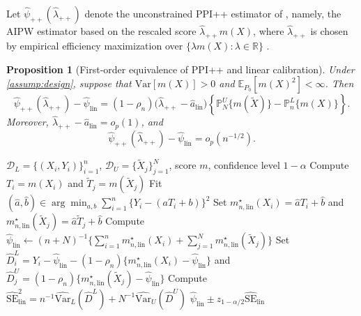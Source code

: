 \documentclass{article}
\theoremstyle{plain}
\newtheorem{proposition}{Proposition}
\theoremstyle{definition}
\newcommand{\E}{\mathbb{E}}
\newcommand{\Var}{\mathrm{Var}}
\newcommand{\1}{\mathbbm{1}}
\newcommand{\mhat}{m}
\newcommand{\rhon}{\rho_n}
\newcommand{\Pl}{\mathbb{P}^{L}_n}
\newcommand{\Pu}{\mathbb{P}^{U}_N}
\begin{document}
Let $\widehat{\psi}_{++}(\widehat{\lambda}_{++})$ denote the
unconstrained PPI++ estimator of \citet{angelopoulos2023ppi},
namely, the AIPW estimator based on the rescaled score
$\widehat{\lambda}_{++}m(X)$, where
$\widehat{\lambda}_{++}$ is chosen by empirical efficiency
maximization over $\{\lambda m(X):\lambda\in\mathbb R\}$
\citep{rubin2008empirical}.

\begin{proposition}[First-order equivalence of PPI++ and linear calibration]
\label{prop:ppi++-linear}
Under \cref{assump:design}, suppose that
$\Var[m(X)]>0$ and $\E_{P_0}[m(X)^2]<\infty$.
Then
\[
\widehat\psi_{++}(\hat\lambda_{++})-\widehat\psi_{\mathrm{lin}}
=
(1-\rho_n)\bigl(\hat\lambda_{++}-\hat a_{\mathrm{lin}}\bigr)
\left\{\Pu\{m(\widetilde X)\}-\Pl\{m(X)\}\right\}.
\]
Moreover, $\hat\lambda_{++}-\hat a_{\mathrm{lin}}
=o_p(1)$, and
\[
\widehat\psi_{++}(\hat\lambda_{++})-\widehat\psi_{\mathrm{lin}}
=
o_p(n^{-1/2}).
\]
\end{proposition}

\begin{algorithm}[t]
\caption{Linearly calibrated PPI}
\label{alg:linearppi-basic}
\begin{algorithmic}[1]
\Require $\mathcal D_L=\{(X_i,Y_i)\}_{i=1}^n$,
$\mathcal D_U=\{\widetilde X_j\}_{j=1}^N$,
score $\mhat$, confidence level $1-\alpha$
\State Compute $T_i=\mhat(X_i)$ and
$\widetilde T_j=\mhat(\widetilde X_j)$
\State Fit
$(\hat a,\hat b)\in\arg\min_{a,b}
\sum_{i=1}^n\{Y_i-(aT_i+b)\}^2$
\State Set
$m_{n,\mathrm{lin}}^\star(X_i)=\hat aT_i+\hat b$
and
$m_{n,\mathrm{lin}}^\star(\widetilde X_j)
=\hat a\widetilde T_j+\hat b$
\State Compute
$\widehat\psi_{\mathrm{lin}}\gets
(n+N)^{-1}
\{\sum_{i=1}^n m_{n,\mathrm{lin}}^\star(X_i)
+\sum_{j=1}^N m_{n,\mathrm{lin}}^\star(\widetilde X_j)\}$
\State Set
$\widehat D_i^L=
Y_i-\widehat\psi_{\mathrm{lin}}
-(1-\rhon)\{m_{n,\mathrm{lin}}^\star(X_i)
-\widehat\psi_{\mathrm{lin}}\}$
and
$\widehat D_j^U=
(1-\rhon)\{m_{n,\mathrm{lin}}^\star(\widetilde X_j)
-\widehat\psi_{\mathrm{lin}}\}$
\State Compute
$\widehat{\mathrm{SE}}_{\mathrm{lin}}^2
=n^{-1}\widehat{\Var}_L(\widehat D^L)
+N^{-1}\widehat{\Var}_U(\widehat D^U)$
\State \Return
$\widehat\psi_{\mathrm{lin}}
\pm z_{1-\alpha/2}\widehat{\mathrm{SE}}_{\mathrm{lin}}$
\end{algorithmic}
\end{algorithm}
\end{document}
